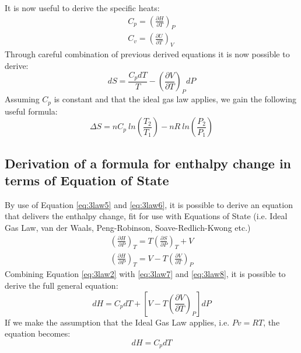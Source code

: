 \documentclass[10pt, oneside, twocolumn]{article}
\numberwithin{equation}{section}
\begin{document}
			It is now useful to derive the specific heats:
			\begin{gather}
			C_p={\left(\frac{\partial H}{\partial T}\right)}_P \label{eq:3law8}\\
			C_v={\left(\frac{\partial U}{\partial T}\right)}_V
			\end{gather}
			Through careful combination of previous derived equations it is now possible to derive:
			\begin{equation}
			dS=\frac{C_p dT}{T}-{\left(\frac{\partial V}{\partial T}\right)}_P dP
			\end{equation}
			Assuming $C_p$ is constant and that the ideal gas law applies, we gain the following useful formula:
			\begin{equation}
			\Delta S=nC_p \ ln\left(\frac{T_2}{T_1}\right)-nR \ ln\left(\frac{P_2}{P_1}\right)
			\end{equation}
		\subsection{Derivation of a formula for enthalpy change in terms of Equation of State}
			By use of Equation \ref{eq:3law5} and \ref{eq:3law6}, it is possible to derive an equation that delivers the enthalpy change, fit for use with Equations of State (i.e. Ideal Gas Law, van der Waals, Peng-Robinson, Soave-Redlich-Kwong etc.)
			\begin{gather}
			{\left(\frac{\partial H}{\partial P}\right)}_T=T{\left(\frac{\partial S}{\partial P}\right)}_T+V\\
			{\left(\frac{\partial H}{\partial P}\right)}_T=V-T{\left(\frac{\partial V}{\partial T}\right)}_P \label{eq:3law7}
			\end{gather}
			Combining Equation \ref{eq:3law2} with \ref{eq:3law7} and \ref{eq:3law8}, it is possible to derive the full general equation:
			\begin{equation}
			dH=C_pdT+\left[V-T{\left(\frac{\partial V}{\partial T}\right)}_P\right]dP
			\end{equation}
			If we make the assumption that the Ideal Gas Law applies, i.e. $Pv=RT$, the equation becomes:
			\begin{equation}
			dH=C_pdT
			\end{equation}
\end{document}
